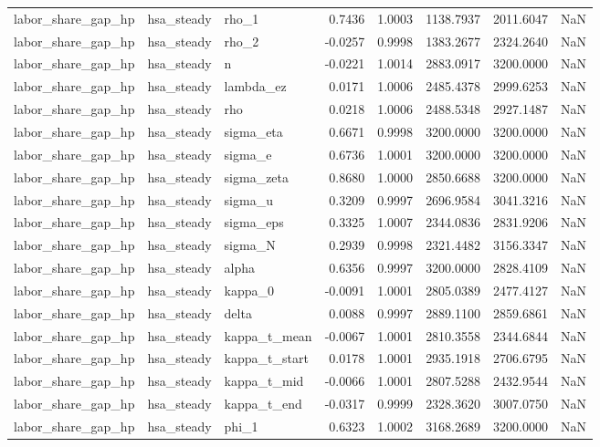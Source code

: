 \begin{tabular}{lllrrrrl}
labor\_share\_gap\_hp & hsa\_steady & rho\_1 & 0.7436 & 1.0003 & 1138.7937 & 2011.6047 & NaN \\
labor\_share\_gap\_hp & hsa\_steady & rho\_2 & -0.0257 & 0.9998 & 1383.2677 & 2324.2640 & NaN \\
labor\_share\_gap\_hp & hsa\_steady & n & -0.0221 & 1.0014 & 2883.0917 & 3200.0000 & NaN \\
labor\_share\_gap\_hp & hsa\_steady & lambda\_ez & 0.0171 & 1.0006 & 2485.4378 & 2999.6253 & NaN \\
labor\_share\_gap\_hp & hsa\_steady & rho & 0.0218 & 1.0006 & 2488.5348 & 2927.1487 & NaN \\
labor\_share\_gap\_hp & hsa\_steady & sigma\_eta & 0.6671 & 0.9998 & 3200.0000 & 3200.0000 & NaN \\
labor\_share\_gap\_hp & hsa\_steady & sigma\_e & 0.6736 & 1.0001 & 3200.0000 & 3200.0000 & NaN \\
labor\_share\_gap\_hp & hsa\_steady & sigma\_zeta & 0.8680 & 1.0000 & 2850.6688 & 3200.0000 & NaN \\
labor\_share\_gap\_hp & hsa\_steady & sigma\_u & 0.3209 & 0.9997 & 2696.9584 & 3041.3216 & NaN \\
labor\_share\_gap\_hp & hsa\_steady & sigma\_eps & 0.3325 & 1.0007 & 2344.0836 & 2831.9206 & NaN \\
labor\_share\_gap\_hp & hsa\_steady & sigma\_N & 0.2939 & 0.9998 & 2321.4482 & 3156.3347 & NaN \\
labor\_share\_gap\_hp & hsa\_steady & alpha & 0.6356 & 0.9997 & 3200.0000 & 2828.4109 & NaN \\
labor\_share\_gap\_hp & hsa\_steady & kappa\_0 & -0.0091 & 1.0001 & 2805.0389 & 2477.4127 & NaN \\
labor\_share\_gap\_hp & hsa\_steady & delta & 0.0088 & 0.9997 & 2889.1100 & 2859.6861 & NaN \\
labor\_share\_gap\_hp & hsa\_steady & kappa\_t\_mean & -0.0067 & 1.0001 & 2810.3558 & 2344.6844 & NaN \\
labor\_share\_gap\_hp & hsa\_steady & kappa\_t\_start & 0.0178 & 1.0001 & 2935.1918 & 2706.6795 & NaN \\
labor\_share\_gap\_hp & hsa\_steady & kappa\_t\_mid & -0.0066 & 1.0001 & 2807.5288 & 2432.9544 & NaN \\
labor\_share\_gap\_hp & hsa\_steady & kappa\_t\_end & -0.0317 & 0.9999 & 2328.3620 & 3007.0750 & NaN \\
labor\_share\_gap\_hp & hsa\_steady & phi\_1 & 0.6323 & 1.0002 & 3168.2689 & 3200.0000 & NaN \\

\end{tabular}

